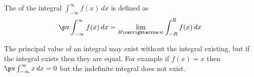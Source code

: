 \documentclass[10pt]{article}
\let\to=\varrightarrow
\begin{document}
\begin{defn*}

    The  of the integral $\int_{-\infty}^\infty f(x)\,dx$ is defined as
    \[ \pv\int_{-\infty}^\infty f(x)\,dx = \lim_{R\to\infty}\int_{-R}^R f(x)\,dx \]

\end{defn*}

The principal value of an integral may exist without the integral existing, but if the integral exists then they are equal.
For example if $f(x)=x$ then $\pv\int_{-\infty}^\infty x\,dx=0$ but the indefinite integral does not exist.
\end{document}
